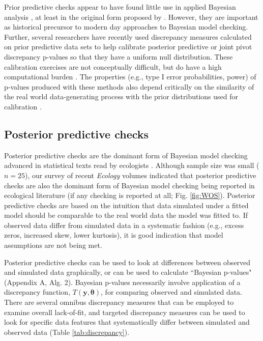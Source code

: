 \documentclass[12pt,english]{article}
\begin{document}
\begin{spacing}{1.9}
Prior predictive checks appear to have found little use in applied Bayesian analysis \citep[but see][]{DeyEtAl1998}, at least in the original form proposed by \citet{Box1980}. However, they are important as historical precursor to modern day approaches to Bayesian model checking. Further, several researchers have recently used discrepancy measures calculated on prior predictive data sets to help calibrate posterior predictive \citep[e.g.,][]{HjortEtAl2006} or joint pivot discrepancy \citep{Johnson2007} p-values so that they have a uniform null distribution.  These calibration exercises are not conceptually difficult, but do have a high computational burden \citep{YuanJohnson2012}. The properties (e.g., type I error probabilities, power) of p-values produced with these methods also depend critically on the similarity of the real world data-generating process with the prior distributions used for calibration \citep{Zhang2014}.

\subsection{Posterior predictive checks}

Posterior predictive checks are the dominant form of Bayesian model checking advanced in statistical texts read by ecologists \citep[e.g.,][]{KingEtAl2009,LinkBarker2010,KerySchaub2012,GelmanEtAl2014}. Although sample size was small ($n=25$), our survey of recent \textit{Ecology} volumes indicated that posterior predictive checks are also the dominant form of Bayesian model checking being reported in ecological literature (if any checking is reported at all; Fig. \ref{fig:WOS}).  Posterior predictive checks are based on the intuition that data simulated under a fitted model should be comparable to the real world data the model was fitted to. If observed data differ from simulated data in a systematic fashion (e.g., excess zeros, increased skew, lower kurtosis), it is good indication that model assumptions are not being met.

Posterior predictive checks can be used to look at differences between observed and simulated data graphically, or can be used to calculate ``Bayesian p-values" (Appendix A, Alg. 2).  Bayesian p-values necessarily involve application of a discrepancy function, $T(\textbf{y},\boldsymbol{\theta})$, for comparing observed and simulated data.  There are several omnibus discrepancy measures that can be employed to examine overall lack-of-fit, and targeted discrepancy measures can be used to look for specific data features that systematically differ between simulated and observed data (Table \ref{tab:discrepancy}).


\end{spacing}
\end{document}
